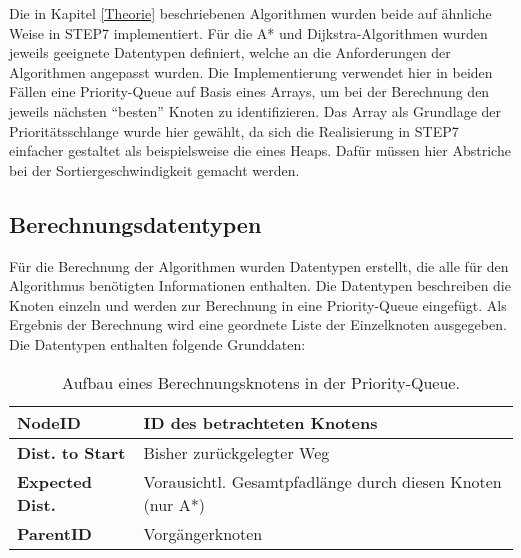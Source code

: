 		Die in Kapitel \ref{Theorie} beschriebenen Algorithmen wurden beide auf ähnliche Weise in \ac{STEP7} implementiert. Für die A* und Dijkstra-Algorithmen wurden jeweils geeignete Datentypen definiert, welche an die Anforderungen der Algorithmen angepasst wurden. Die Implementierung verwendet hier in beiden Fällen eine Priority-Queue auf Basis eines Arrays, um bei der Berechnung den jeweils nächsten "`besten"' Knoten zu identifizieren. Das Array als Grundlage der Prioritätsschlange wurde hier gewählt, da sich die Realisierung in \ac{STEP7} einfacher gestaltet als beispielsweise die eines Heaps. Dafür müssen hier Abstriche bei der Sortiergeschwindigkeit gemacht werden.
		
		\subsection{Berechnungsdatentypen}
			\label{Datentypen_Berechnung}
			Für die Berechnung der Algorithmen wurden Datentypen erstellt, die alle für den Algorithmus benötigten Informationen enthalten. Die Datentypen beschreiben die Knoten einzeln und werden zur Berechnung in eine Priority-Queue eingefügt. Als Ergebnis der Berechnung wird eine geordnete Liste der Einzelknoten ausgegeben. Die Datentypen enthalten folgende Grunddaten:
			\\
			\begin{table}[h]
				\begin{tabular}{| l | l |}
					\hline
					\textbf{NodeID} & ID des betrachteten Knotens\\ \hline
					\textbf{Dist. to Start} & Bisher zurückgelegter Weg\\ \hline
					\textbf{Expected Dist.} & Vorausichtl. Gesamtpfadlänge durch diesen Knoten (nur A*)\\ \hline
					\textbf{ParentID} & Vorgängerknoten\\
					\hline
				\end{tabular}
				\vspace{0.2cm}
				\caption{Aufbau eines Berechnungsknotens in der Priority-Queue.}
			\end{table}
			
